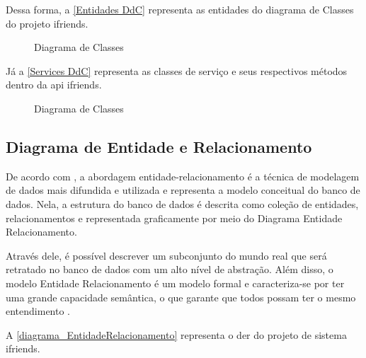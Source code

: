 Dessa forma, a \autoref{Entidades DdC} representa as entidades do diagrama de Classes do projeto \gls{ifriends}.

\begin{figure}[htb]
\centering
\caption{Diagrama de Classes}
\label{Entidades DdC}

\end{figure}
\FloatBarrier

Já a \autoref{Services DdC} representa as classes de serviço e seus respectivos métodos dentro da \gls{api} \gls{ifriends}.

\begin{figure}[htb]
\centering
\caption{Diagrama de Classes}
\label{Services DdC}

\end{figure}
\FloatBarrier

\subsection{Diagrama de Entidade e Relacionamento}
De acordo com , a abordagem entidade-relacionamento é a técnica de modelagem de dados mais difundida e utilizada e representa a modelo conceitual do banco de dados. Nela, a estrutura do banco de dados é descrita como coleção de entidades, relacionamentos e representada graficamente por meio do Diagrama Entidade Relacionamento.

Através dele, é possível descrever um subconjunto do mundo real que será retratado no banco de dados com um alto nível de abstração. Além disso, o modelo Entidade Relacionamento é um modelo formal e caracteriza-se por ter uma grande capacidade semântica, o que garante que todos possam ter o mesmo entendimento \cite{leal2015linguagem}.

A \autoref{diagrama_EntidadeRelacionamento} representa o \ac{der} do projeto de sistema \gls{ifriends}.

